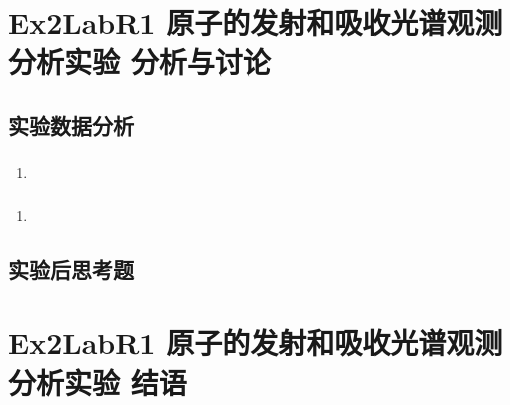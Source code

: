 \documentclass[dvipsnames, svgnames,a4paper,11pt]{article}
\begin{document}
	\section{Ex2LabR1 原子的发射和吸收光谱观测分析实验 \quad\heiti 分析与讨论}
	
	\subsection{实验数据分析}
	
	\subsubsection{}
	\begin{enumerate}
		\item 
	\end{enumerate}
	
	\subsubsection{}
	\begin{enumerate}
		\item 
	\end{enumerate}
	
	\subsubsection{}
	
	
	\subsection{实验后思考题}
	
	\begin{question}
		
	\end{question}
	
	\begin{question}
		
	\end{question}
	
	\begin{question}
		
	\end{question}
	
	
	
	\clearpage
	
	\section{Ex2LabR1 原子的发射和吸收光谱观测分析实验 \quad\heiti 结语}
	
\end{document}
